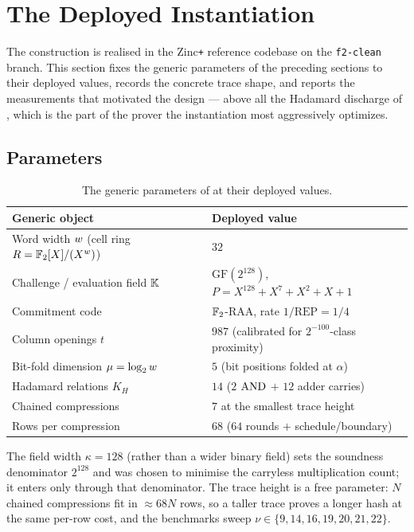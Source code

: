 \section{The Deployed Instantiation}
\label{sec:impl}

The construction is realised in the Zinc\texttt{+} reference codebase on the
\texttt{f2-clean} branch. This section fixes the generic parameters of the
preceding sections to their deployed values, records the concrete trace
shape, and reports the measurements that motivated the design --- above all
the Hadamard discharge of , which is the part of
the prover the instantiation most aggressively optimizes.

\subsection{Parameters}
\label{sec:impl-params}

\begin{table}[h]
\centering
\renewcommand{\arraystretch}{1.2}
\begin{tabular}{l l}
\toprule
Generic object & Deployed value \\
\midrule
Word width $w$ (cell ring $R=\mathbb{F}_2[X]/(X^{w})$) & $32$ \\
Challenge / evaluation field $\mathbb{K}$ & $\mathrm{GF}(2^{128})$, $P=X^{128}+X^7+X^2+X+1$ \\
Commitment code & $\mathbb{F}_2$-RAA, rate $1/\mathrm{REP}=1/4$ \\
Column openings $t$ & $987$ (calibrated for $2^{-100}$-class proximity) \\
Bit-fold dimension $\mu=\log_2w$ & $5$ (bit positions folded at $\alpha$) \\
Hadamard relations $K_H$ & $14$ ($2$ $\operatorname{AND}$ $+$ $12$ adder carries) \\
Chained compressions & $7$ at the smallest trace height \\
Rows per compression & $68$ ($64$ rounds $+$ schedule/boundary) \\
\bottomrule
\end{tabular}
\caption{The generic parameters of 
at their deployed values.}
\end{table}

The field width $\kappa=128$ (rather than a wider binary field) sets the
soundness denominator $2^{128}$ and was chosen to minimise the carryless
multiplication count; it enters  only through that
denominator. The trace height is a free parameter: $N$ chained compressions
fit in $\approx 68N$ rows, so a taller trace proves a longer hash at the
same per-row cost, and the benchmarks sweep $\nu\in\{9,14,16,19,20,21,22\}$.

